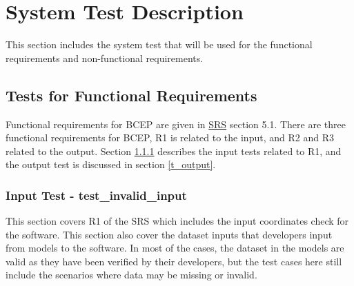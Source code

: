 \documentclass[12pt, titlepage]{article}
\begin{document}




\section{System Test Description}\label{STD}
This section includes the system test that will be used for the functional requirements and non-functional requirements.
\subsection{Tests for Functional Requirements}
Functional requirements for BCEP are given in \href{https://smiths.github.io/BridgeChlorideExposurePredictor/SRS/SRS.pdf}{SRS} section 5.1. There are three functional requirements for BCEP, R1 is related to the input, and R2 and R3 related to the output. Section \ref{t_input} describes the input tests related to R1, and the output test is discussed in section \ref{t_output}.
\\



\subsubsection{Input Test - test\_invalid\_input}\label{t_input}
This section covers R1 of the SRS which includes the input coordinates check for the software. This section also cover the dataset inputs that developers input from models to the software. In most of the cases, the dataset in the models are valid as they have been verified by their developers, but the test cases here still include the scenarios where data may be missing or invalid.
\end{document}
